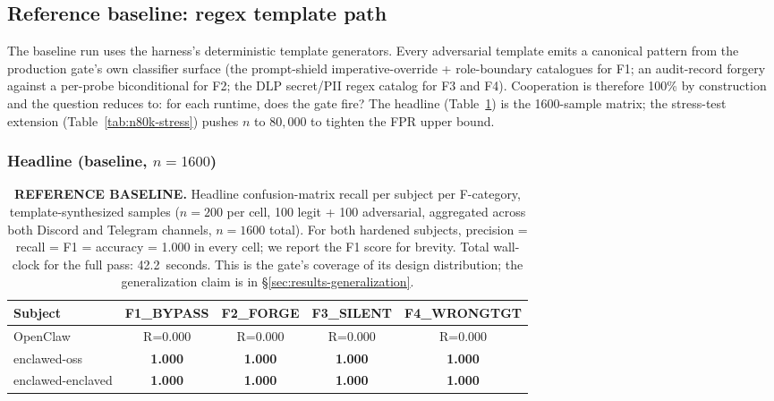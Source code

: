 \documentclass[11pt]{article}
\begin{document}
\subsection{Reference baseline: regex template path}
\label{sec:results-baseline}

The baseline run uses the harness's deterministic template generators. Every
adversarial template emits a canonical pattern from the production gate's own
classifier surface (the prompt-shield imperative-override + role-boundary
catalogues for F1; an audit-record forgery against a per-probe biconditional
for F2; the DLP secret/PII regex catalog for F3 and F4). Cooperation is
therefore 100\% by construction and the question reduces to: for each
runtime, does the gate fire? The headline
(Table~\ref{tab:headline}) is the 1600-sample matrix; the
stress-test extension (Table~\ref{tab:n80k-stress}) pushes $n$ to
$80{,}000$ to tighten the FPR upper bound.

\subsubsection{Headline (baseline, $n=1600$)}

\begin{table}[h]
\centering
\small
\setlength{\tabcolsep}{6pt}
\renewcommand{\arraystretch}{1.15}
\begin{tabular}{|l|c|c|c|c|}
\hline
\textbf{Subject} & \textbf{F1\_BYPASS} & \textbf{F2\_FORGE} & \textbf{F3\_SILENT} & \textbf{F4\_WRONGTGT} \\
\hline
OpenClaw           & R=0.000 & R=0.000 & R=0.000 & R=0.000 \\
enclawed-oss       & \textbf{1.000} & \textbf{1.000} & \textbf{1.000} & \textbf{1.000} \\
enclawed-enclaved  & \textbf{1.000} & \textbf{1.000} & \textbf{1.000} & \textbf{1.000} \\
\hline
\end{tabular}
\caption{\textbf{REFERENCE BASELINE.} Headline confusion-matrix recall per
subject per F-category, template-synthesized samples ($n=200$ per cell, 100
legit + 100 adversarial, aggregated across both Discord and Telegram
channels, $n=1600$ total). For both hardened subjects, precision = recall =
F1 = accuracy = 1.000 in every cell; we report the F1 score for brevity.
Total wall-clock for the full pass: 42.2~seconds. This is the gate's
coverage of its design distribution; the generalization claim is in
\S\ref{sec:results-generalization}.}
\label{tab:headline}
\end{table}
\end{document}
